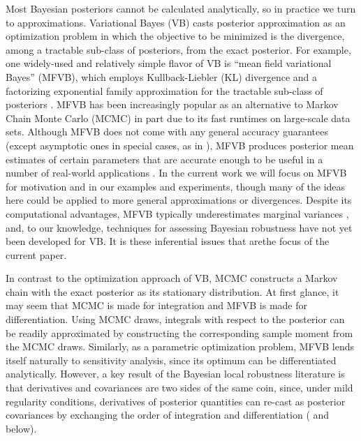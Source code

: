 \documentclass{article}\usepackage[]{graphicx}\usepackage[]{color}
\theoremstyle{plain}
\theoremstyle{definition}
\theoremstyle{plain}
\theoremstyle{plain}
\theoremstyle{plain}
\theoremstyle{plain}
\begin{document}
Most Bayesian posteriors cannot be calculated analytically, so in
practice we turn to approximations. Variational Bayes (VB) casts posterior
approximation as an optimization problem in which the objective to
be minimized is the divergence, among a tractable sub-class of posteriors,
from the exact posterior. For example, one widely-used and relatively
simple flavor of VB is ``mean field variational Bayes'' (MFVB),
which employs Kullback-Liebler (KL) divergence and a factorizing exponential
family approximation for the tractable sub-class of posteriors \citep{wainwright2008graphical}.
MFVB has been increasingly popular as an alternative to Markov Chain
Monte Carlo (MCMC) in part due to its fast runtimes on large-scale
data sets. Although MFVB does not come with any general accuracy guarantees
(except asymptotic ones in special cases, as in \citet{westling:2015:vbconsistency,wang:2017:vbconsistency}),
MFVB produces posterior mean estimates of certain parameters that
are accurate enough to be useful in a number of real-world applications
\citep{blei:2016:variational}. In the current work we will focus
on MFVB for motivation and in our examples and experiments, though
many of the ideas here could be applied to more general approximations
or divergences. Despite its computational advantages, MFVB typically
underestimates marginal variances \citep{mackay:2003:information,wang:2005:inadequacy,turner:2011:two},
and, to our knowledge, techniques for assessing Bayesian robustness
have not yet been developed for VB.  It is these inferential issues
that arethe focus of the current paper.

In contrast to the optimization approach of VB, MCMC constructs a
Markov chain with the exact posterior as its stationary distribution.
At first glance, it may seem that MCMC is made for integration and
MFVB is made for differentiation. Using MCMC draws, integrals with
respect to the posterior can be readily approximated by constructing
the corresponding sample moment from the MCMC draws. Similarly, as
a parametric optimization problem, MFVB lends itself naturally to
sensitivity analysis, since its optimum can be differentiated analytically.
However, a key result of the Bayesian local robustness literature
is that derivatives and covariances are two sides of the same coin,
since, under mild regularity conditions, derivatives of posterior
quantities can re-cast as posterior covariances by exchanging the
order of integration and differentiation (\citet{gustafson:1996:localposterior,basu:1996:local,efron:2015:frequentist}
and  below). 
\end{document}
